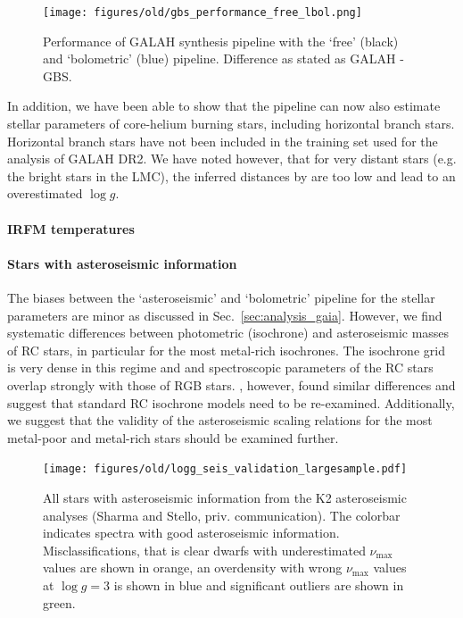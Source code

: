 \documentclass[fleqn,usenatbib,useAMS]{mnras}
\begin{document}
\begin{figure}
\centering
\texttt{[image: figures/old/gbs\_performance\_free\_lbol.png]}
\caption[{Performance of GALAH synthesis pipeline with the `free' (black) and `bolometric' (blue) pipeline.}]{Performance of GALAH synthesis pipeline with the `free' (black) and `bolometric' (blue) pipeline. Difference as stated as GALAH - GBS.}
\label{fig:gbs_performance}
\end{figure}

In addition, we have been able to show that the pipeline can now also estimate stellar parameters of core-helium burning stars, including horizontal branch stars. Horizontal branch stars have not been included in the training set used for the analysis of GALAH DR2. We have noted however, that for very distant stars (e.g. the bright stars in the LMC), the inferred distances by \citet{BailerJones2018} are too low and lead to an overestimated $\log g$.

\paragraph*{IRFM temperatures}

\paragraph*{Stars with asteroseismic information}

The biases between the `asteroseismic' and `bolometric' pipeline for the stellar parameters are minor as discussed in Sec.~\ref{sec:analysis_gaia}. However, we find systematic differences between photometric (isochrone) and asteroseismic masses of RC stars, in particular for the most metal-rich isochrones. The isochrone grid is very dense in this regime and and spectroscopic parameters of the RC stars overlap strongly with those of RGB stars. \citet{An2019}, however, found similar differences and suggest that standard RC isochrone models need to be re-examined. Additionally, we suggest that the validity of the asteroseismic scaling relations \citep[see e.g.][]{Epstein2014, Huber2017, Viani2017, Pinsonneault2018} for the most metal-poor and metal-rich stars should be examined further. 

\begin{figure}
\centering
\texttt{[image: figures/old/logg\_seis\_validation\_largesample.pdf]}
\caption[{All stars with asteroseismic information from the K2 asteroseismic analyses (Sharma and Stello, priv. communication).}]{All stars with asteroseismic information from the K2 asteroseismic analyses (Sharma and Stello, priv. communication). The colorbar indicates spectra with good asteroseismic information. Misclassifications, that is clear dwarfs with underestimated $\nu_\text{max}$ values are shown in orange, an overdensity with wrong $\nu_\text{max}$ values at $\log g = 3$ is shown in blue and significant outliers are shown in green.}
\label{fig:all_seismic}
\end{figure}
\end{document}

